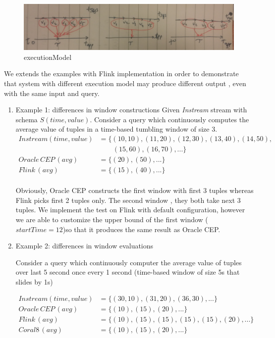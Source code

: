 	\begin{figure}[htbp!] 
\centering    
\includegraphics[width=1\textwidth]{executionModel}
\caption{executionModel}
\label{fig:executionModel}
\end{figure}


We extends the examples \citep{Dindar:2013} with Flink implementation in order to demonstrate that system with different execution model may produce different output , even with the same input and query. 
\begin{enumerate}

\item Example 1: differences in window constructions
Given \textit{Instream} stream with schema $S(time, value)$. Consider a query which continuously computes the average value of tuples in a time-based tumbling window of size 3.
\begin{align*}
Instream(time,value) &= \{(10,10),(11,20),(12,30),(13,40),(14,50),\\
&\qquad (15,60),(16,70),...\} \\
Oracle\, CEP\, (avg)		&= \{(20), (50),...\} \\
Flink\, (avg)			&= \{(15), (40),...\} \\
\end{align*}

Obviously, Oracle CEP constructs the first window with first 3 tuples whereas Flink picks first 2 tuples only. The second window , they both take next 3 tuples. We implement the test on Flink with default configuration, however we are able to customize the upper bound of the first window ($startTime = 12$)so that it produces the same result as Oracle CEP.


\item Example 2: differences in window evaluations

Consider a query which continuously computer the average value of tuples over last 5 second once every 1 second (time-based window of size 5s that slides by 1s)

\begin{align*}
Instream(time,value) 	&= \{(30,10),(31,20),(36,30),...\} \\
Oracle\, CEP\, (avg)		&= \{(10), (15),(20),...\} \\
Flink\, (avg)			&= \{(10), (15), (15), (15), (15), (20),...\}\\
Coral8\, (avg)			&= \{(10), (15),(20),...\}			
\end{align*}


\end{enumerate}

